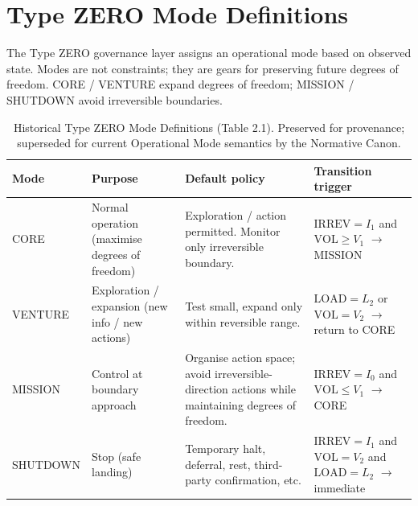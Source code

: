 
\section{Type ZERO Mode Definitions}
\label{sec:type-zero-modes-c2}


The Type ZERO governance layer assigns an operational mode based on
observed state. Modes are not constraints; they are gears for
preserving future degrees of freedom. CORE / VENTURE expand degrees
of freedom; MISSION / SHUTDOWN avoid irreversible boundaries.

\begin{table}[ht]
\centering
\small
\begin{tabularx}{\linewidth}{lXXX}
\toprule
\textbf{Mode} & \textbf{Purpose} & \textbf{Default policy} & \textbf{Transition trigger} \\
\midrule
CORE
& Normal operation (maximise degrees of freedom)
& Exploration / action permitted. Monitor only irreversible
boundary.
& $\mathrm{IRREV} = I_1$ and $\mathrm{VOL} \ge V_1$ $\to$ MISSION \\

VENTURE
& Exploration / expansion (new info / new actions)
& Test small, expand only within reversible range.
& $\mathrm{LOAD} = L_2$ or $\mathrm{VOL} = V_2$ $\to$ return to CORE \\

MISSION
& Control at boundary approach
& Organise action space; avoid irreversible-direction actions while
maintaining degrees of freedom.
& $\mathrm{IRREV} = I_0$ and $\mathrm{VOL} \le V_1$ $\to$ CORE \\

SHUTDOWN
& Stop (safe landing)
& Temporary halt, deferral, rest, third-party confirmation, etc.
& $\mathrm{IRREV} = I_1$ and $\mathrm{VOL} = V_2$ and
$\mathrm{LOAD} = L_2$ $\to$ immediate \\
\bottomrule
\end{tabularx}
\caption[Historical Type ZERO Mode Definitions]{Historical Type ZERO
Mode Definitions (Table 2.1). Preserved for provenance; superseded for
current Operational Mode semantics by the Normative Canon.}
\label{tab:type-zero-modes}
\end{table}

